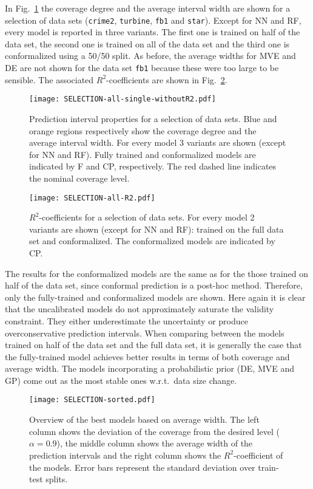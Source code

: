 \documentclass[smallcondensed]{svjour3}
\begin{document}
    In Fig.~\ref{fig:PI_all} the coverage degree and the average interval width are shown for a selection of data sets (\texttt{crime2}, \texttt{turbine}, \texttt{fb1} and \texttt{star}). Except for NN and RF, every model is reported in three variants. The first one is trained on half of the data set, the second one is trained on all of the data set and the third one is conformalized using a 50/50 split. As before, the average widths for MVE and DE are not shown for the data set \texttt{fb1} because these were too large to be sensible. The associated $R^2$-coefficients are shown in Fig.~\ref{fig:R2_all}.
    \begin{figure}[t!]
        \centering
        \texttt{[image: SELECTION-all-single-withoutR2.pdf]}
        \caption{Prediction interval properties for a selection of data sets. Blue and orange regions respectively show the coverage degree and the average interval width. For every model 3 variants are shown (except for NN and RF). Fully trained and conformalized models are indicated by F and CP, respectively. The red dashed line indicates the nominal coverage level.}
        \label{fig:PI_all}
    \end{figure}
    \begin{figure}[t!]
        \centering
        \texttt{[image: SELECTION-all-R2.pdf]}
        \caption{$R^2$-coefficients for a selection of data sets. For every model 2 variants are shown (except for NN and RF): trained on the full data set and conformalized. The conformalized models are indicated by CP.}
        \label{fig:R2_all}
    \end{figure}
    The results for the conformalized models are the same as for the those trained on half of the data set, since conformal prediction is a post-hoc method. Therefore, only the fully-trained and conformalized models are shown. Here again it is clear that the uncalibrated models do not approximately saturate the validity constraint. They either underestimate the uncertainty or produce overconservative prediction intervals. When comparing between the models trained on half of the data set and the full data set, it is generally the case that the fully-trained model achieves better results in terms of both coverage and average width. The models incorporating a probabilistic prior (DE, MVE and GP) come out as the most stable ones w.r.t.\ data size change.

    \begin{figure}[p]
        \centering
        \texttt{[image: SELECTION-sorted.pdf]}
        \caption{Overview of the best models based on average width. The left column shows the deviation of the coverage from the desired level ($\alpha = 0.9$), the middle column shows the average width of the prediction intervals and the right column shows the $R^2$-coefficient of the models. Error bars represent the standard deviation over train-test splits.}
        \label{fig:top5}
    \end{figure}
\end{document}

